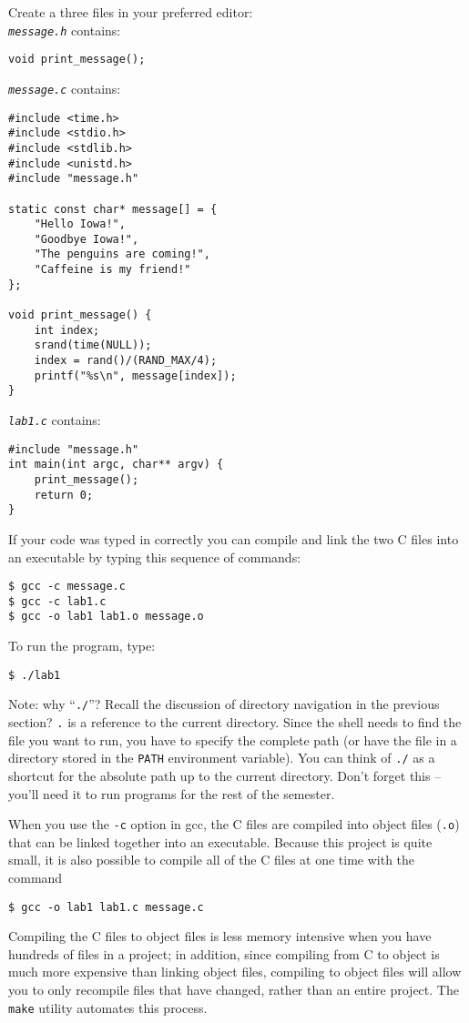 \documentclass[letterpaper,10pt]{article}
\newcommand{\cmd}[1]{\texttt{#1}}
\begin{document}
Create a three files in your preferred editor:
\\
\emph{\texttt{message.h}} contains:
\begin{verbatim}
void print_message();
\end{verbatim}
\emph{\texttt{message.c}} contains:
\begin{verbatim}
#include <time.h>
#include <stdio.h>
#include <stdlib.h>
#include <unistd.h>
#include "message.h"

static const char* message[] = {
    "Hello Iowa!",
    "Goodbye Iowa!",
    "The penguins are coming!",
    "Caffeine is my friend!"
};

void print_message() {
    int index;
    srand(time(NULL));
    index = rand()/(RAND_MAX/4);
    printf("%s\n", message[index]);
}
\end{verbatim}
\emph{\texttt{lab1.c}} contains:
\begin{verbatim}
#include "message.h"
int main(int argc, char** argv) {
    print_message();
    return 0;
}
\end{verbatim}
If your code was typed in correctly you can compile and link the two C files into an executable by typing this sequence of commands:
\begin{verbatim}
$ gcc -c message.c
$ gcc -c lab1.c
$ gcc -o lab1 lab1.o message.o
\end{verbatim}
To run the program, type:
\begin{verbatim}
$ ./lab1
\end{verbatim}

Note: why ``\texttt{./}''? Recall the discussion of directory navigation in the previous section? \texttt{.} is a reference to the current directory. Since the shell needs to find the file you want to run, you have to specify the complete path (or have the file in a directory stored in the \cmd{PATH} environment variable). You can think of \cmd{./} as a shortcut for the absolute path up to the current directory. Don't forget this -- you'll need it to run programs for the rest of the semester.

When you use the \cmd{-c} option in gcc, the C files are compiled into object files (\cmd{.o}) that can be linked together into an executable. Because this project is quite small, it is also possible to compile all of the C files at one time with the command
\begin{verbatim}
$ gcc -o lab1 lab1.c message.c
\end{verbatim}
Compiling the C files to object files is less memory intensive when you have hundreds of files in a project; in addition, since compiling from C to object is much more expensive than linking object files, compiling to object files will allow you to only recompile files that have changed, rather than an entire project. The \cmd{make} utility automates this process.
\end{document}
